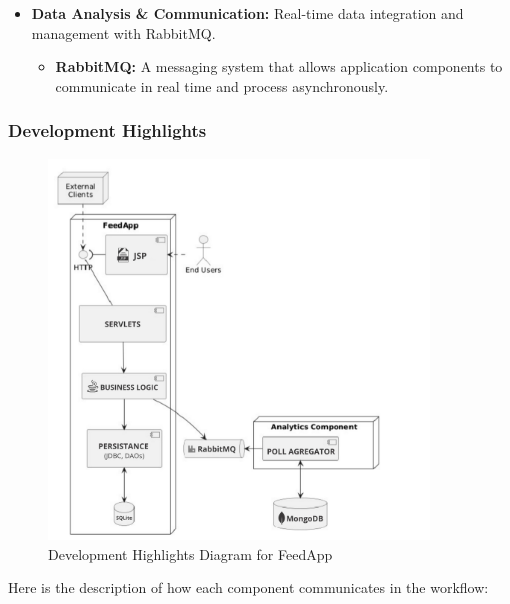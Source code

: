 \begin{itemize}
    \item \textbf{Data Analysis \& Communication:} Real-time data integration and management with RabbitMQ.
    \begin{itemize}
        \item \textbf{RabbitMQ:} A messaging system that allows application components to communicate in real time and process asynchronously.
    \end{itemize}
\end{itemize}

\subsubsection{Development Highlights}

\begin{figure}[h!]
    \centering
    \includegraphics[width=0.9\textwidth]{figs/architecture_diagram.jpg} 
    \caption{Development Highlights Diagram for FeedApp}
    \label{fig:development_highlights}
\end{figure}

Here is the description of how each component communicates in the workflow:

